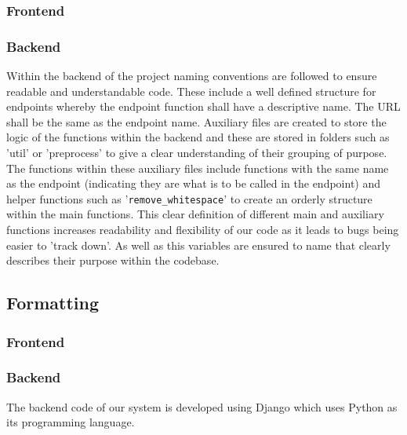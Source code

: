 \documentclass[12pt]{article}
\begin{document}
\subsubsection{Frontend}

\subsubsection{Backend}
Within the backend of the project naming conventions are followed to ensure readable and understandable code. These include a well defined structure for endpoints whereby the endpoint function shall have a descriptive name. The URL shall be the same as the endpoint name. Auxiliary files are created to store the logic of the functions within the backend and these are stored in folders such as 'util' or 'preprocess' to give a clear understanding of their grouping of purpose. The functions within these auxiliary files include functions with the same name as the endpoint (indicating they are what is to be called in the endpoint) and helper functions such as '\texttt{remove\_whitespace}' to create an orderly structure within the main functions. This clear definition of different main and auxiliary functions increases readability and flexibility of our code as it leads to bugs being easier to 'track down'. As well as this variables are ensured to name that clearly describes their purpose within the codebase.

\subsection{Formatting}
\subsubsection{Frontend}

\subsubsection{Backend}
The backend code of our system is developed using Django which uses Python as its programming language.
\end{document}
